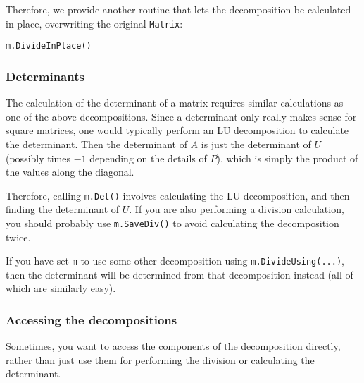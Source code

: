 \documentclass[twoside,letterpaper,11pt]{article}
\renewcommand{\tt}[1]{{\texttt {#1}}}
\begin{document}
Therefore, we provide another routine that lets the decomposition be 
calculated in place, overwriting the original \tt{Matrix}:
\begin{verbatim}
m.DivideInPlace()
\end{verbatim}

\subsubsection{Determinants}
\label{determinants}

The calculation of the determinant of a matrix requires similar calculations as
one of the above decompositions.  Since a determinant only really makes sense
for square matrices, one would typically perform an LU decomposition to calculate
the determinant.  Then the determinant of $A$ is just the determinant of $U$
(possibly times $-1$ depending on the details of $P$), which is simply the 
product of the values along the diagonal.

Therefore, calling \tt{m.Det()} involves calculating the LU decomposition, and then
finding the determinant of $U$.  
If you are also performing a division calculation, you should probably use
\tt{m.SaveDiv()} to avoid calculating the decomposition twice.

If you have set \tt{m} to use some other decomposition using 
\tt{m.DivideUsing(...)},
then the determinant will be determined from that decomposition instead 
(all of which are similarly easy).

\subsubsection{Accessing the decompositions}

Sometimes, you want to access the components of the decomposition directly,
rather than just use them for performing the division or calculating the determinant.
\end{document}
